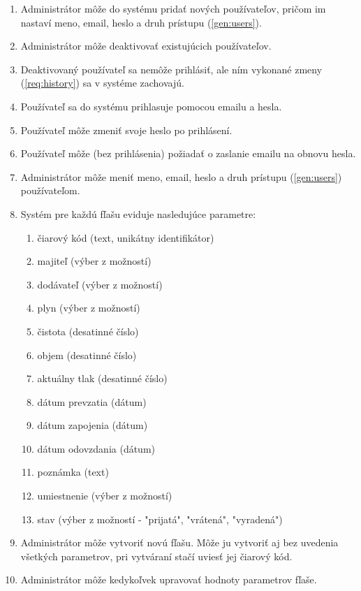 \documentclass{zah}
\begin{document}
\begin{enumerate}
\item Administrátor môže do systému pridať nových používateľov, pričom im nastaví meno, email, heslo a druh prístupu (\ref{gen:users}).
\item Administrátor môže deaktivovať existujúcich používateľov.
\item Deaktivovaný používateľ sa nemôže prihlásiť, ale ním vykonané zmeny (\ref{req:history}) sa v systéme zachovajú.
\item Používateľ sa do systému prihlasuje pomocou emailu a hesla.
\item Používateľ môže zmeniť svoje heslo po prihlásení.
\item Používateľ môže (bez prihlásenia) požiadať o zaslanie emailu na obnovu hesla.
\item Administrátor môže meniť meno, email, heslo a druh prístupu (\ref{gen:users}) používateľom.
\item Systém pre každú fľašu eviduje nasledujúce parametre: 
\begin{enumerate}
	\tightlist
	\item čiarový kód (text, unikátny identifikátor)
	\item \label{req:param:owner} majiteľ (výber z možností)
	\item \label{req:param:provider} dodávateľ (výber z možností)
	\item \label{req:param:gas} plyn (výber z možností)
	\item čistota (desatinné číslo)
	\item objem (desatinné číslo)
	\item \label{req:param:pressure} aktuálny tlak (desatinné číslo)
	\item dátum prevzatia (dátum)
	\item dátum zapojenia (dátum)
	\item dátum odovzdania (dátum)
	\item poznámka (text)
	\item \label{req:param:location} umiestnenie (výber z možností)
	\item stav (výber z možností - "prijatá", "vrátená", "vyradená")
\end{enumerate}
\item Administrátor môže vytvoriť novú fľašu. Môže ju vytvoriť aj bez uvedenia všetkých parametrov, pri vytváraní stačí uviesť jej čiarový kód.
\item Administrátor môže kedykoľvek upravovať hodnoty parametrov fľaše.

\end{enumerate}
\end{document}
